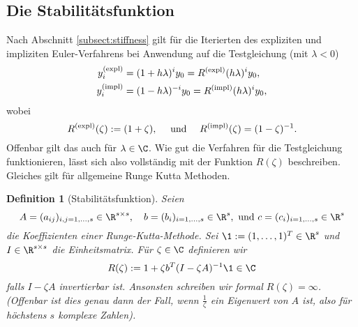 \documentclass[
]{mycourse}
\theoremstyle{mythm}
\newtheorem{definition}[theorem]{Definition}
\theoremstyle{break}
\begin{document}
\subsection{Die Stabilitätsfunktion}

Nach Abschnitt \ref{subsect:stiffness} gilt für die Iterierten des expliziten und impliziten Euler-Verfahrens
bei Anwendung auf die Testgleichung (mit $\lambda<0$)
\begin{align*}
y_i^{\mbox{\scriptsize (expl)}}&=(1+h\lambda )^i y_0=R^{\mbox{\scriptsize (expl)}}(h\lambda)^i y_0,\\
y_i^{\mbox{\scriptsize (impl)}}&=(1-h\lambda )^{-i} y_0=R^{\mbox{\scriptsize (impl)}}(h\lambda)^i y_0,
\end{align*}
wobei
\[
R^{\mbox{\scriptsize (expl)}}(\zeta):=(1+\zeta ), \quad \mbox{ und } \quad R^{\mbox{\scriptsize (impl)}}(\zeta)=(1-\zeta )^{-1}.
\]
Offenbar gilt das auch für $\lambda\in \C$. Wie gut die Verfahren für die Testgleichung funktionieren, lässt sich also
vollständig mit der Funktion $R(\zeta)$ beschreiben. Gleiches gilt für allgemeine Runge Kutta Methoden.

\begin{definition}[Stabilitätsfunktion]
Seien
\[
A=(a_{ij})_{i,j=1,\ldots,s}\in \R^{s\times s},\quad b=(b_i)_{i=1,\ldots,s}\in \R^s, \mbox{ und } c=(c_i)_{i=1,\ldots,s}\in \R^s
\]
die Koeffizienten einer Runge-Kutta-Methode. Sei
 $\1:=(1,\ldots,1)^T\in \R^s$ und $I\in \R^{s\times s}$ die Einheitsmatrix. Für $\zeta\in \C$ definieren wir
\[
R(\zeta):=1+\zeta b^T (I-\zeta A)^{-1} \1\in \C
\]
falls $I-\zeta A$ invertierbar ist. Ansonsten schreiben wir formal $R(\zeta)=\infty$.
(Offenbar ist dies genau dann der Fall, wenn $\frac{1}{\zeta}$ ein Eigenwert von $A$ ist,
also für höchstens $s$ komplexe Zahlen).
\end{definition}
\end{document}
